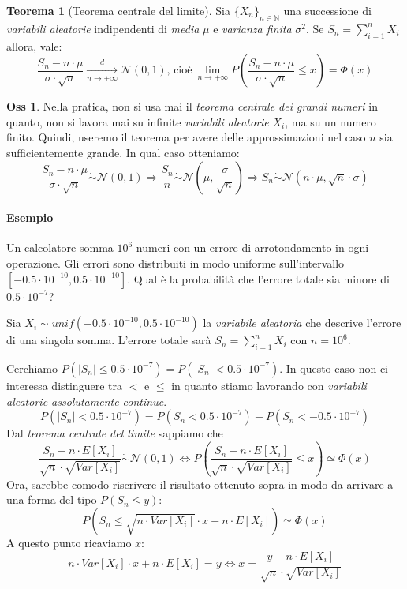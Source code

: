 \documentclass[12pt, a4paper]{report}
\theoremstyle{definition}
\newtheorem{theorem}{Teorema}[section]
\newtheorem*{observation}{Oss}
\DeclareRobustCommand{\N}{\mathbb{N}}%
\DeclareRobustCommand{\norm}{\mathcal{N}}
\newcommand\conv[2]{\xrightarrow[#2\to +\infty]{#1}}
\begin{document}
\begin{theorem}[Teorema centrale del limite]
	Sia \(\{X_n\}_{n\in\N}\) una successione di \emph{variabili aleatorie}
	indipendenti di \emph{media} $\mu$ e \emph{varianza finita} $\sigma^2$. Se
	\(S_n=\sum_{i=1}^nX_i\) allora, vale:
	\[\frac{S_n-n\cdot \mu}{\sigma\cdot \sqrt{n}}\conv{d}{n}\norm(0,1)\text{, cioè}\ \lim_
	{n\to +\infty}P\left(\frac{S_n-n\cdot \mu}{\sigma\cdot \sqrt{n}}\leq x\right)=\Phi(x)\]
\end{theorem}

\begin{observation}
	Nella pratica, non si usa mai il \emph{teorema centrale dei grandi numeri} in
	quanto, non si lavora mai su infinite \emph{variabili aleatorie} $X_i$, ma
	su un numero finito. Quindi, useremo il teorema per avere delle approssimazioni
	nel caso $n$ sia sufficientemente grande. In qual caso otteniamo:
	\[\frac{S_n-n\cdot \mu}{\sigma\cdot \sqrt{n}}\dot{\sim}\norm(0,1)\Rightarrow \frac{S_n}
	{n}\dot{\sim}\norm(\mu, \frac{\sigma}{\sqrt{n}})\Rightarrow S_n\dot{\sim}\norm
	(n\cdot \mu, \sqrt{n}\cdot \sigma)\]
\end{observation}

\paragraph*{Esempio}
Un calcolatore somma $10^6$ numeri con un errore di arrotondamento in ogni operazione.
Gli errori sono distribuiti in modo uniforme sull'intervallo \([-0.5\cdot 10^{-10},
0.5\cdot 10^{-10}]\). Qual è la probabilità che l'errore totale sia minore di $0.5\cdot 10^{-7}$?

Sia $X_i\sim unif(-0.5\cdot 10^{-10}, 0.5\cdot 10^{-10})$ la \emph{variabile aleatoria} che
descrive l'errore di una singola somma. L'errore totale sarà \(S_n=\sum_{i=1}^n
X_i\) con $n=10^6$.

Cerchiamo \(P(|S_n|\leq0.5\cdot 10^{-7})=P(|S_n|<0.5\cdot 10^{-7})\).
In questo caso non ci interessa distinguere tra $<$ e $\leq$ in quanto stiamo
lavorando con \emph{variabili aleatorie assolutamente continue}.
\[P(|S_n|<0.5\cdot 10^{-7})=P(S_n<0.5\cdot 10^{-7})-P(S_n<-0.5\cdot 10^{-7})\]
Dal \emph{teorema centrale del limite} sappiamo che
\[\frac{S_n-n\cdot E[X_i]}{\sqrt{n}\cdot \sqrt{Var[X_i]}}\dot{\sim}\norm(0,1)\Leftrightarrow
P\left(\frac{S_n-n\cdot E[X_i]}{\sqrt{n}\cdot \sqrt{Var[X_i]}}\leq x\right)\simeq\Phi(x)\]
Ora, sarebbe comodo riscrivere il risultato ottenuto sopra in modo da arrivare a
una forma del tipo \(P(S_n\leq y)\):
\[P\left(S_n\leq \sqrt{n\cdot Var[X_i]}\cdot x+n\cdot E[X_i]\right)\simeq\Phi(x)\]
A questo punto ricaviamo $x$:
\[n\cdot Var[X_i]\cdot x+n\cdot E[X_i]=y\Leftrightarrow x=\frac{y-n\cdot E[X_i]}{\sqrt{n}\cdot 
\sqrt{Var[X_i]}}\]
\end{document}
